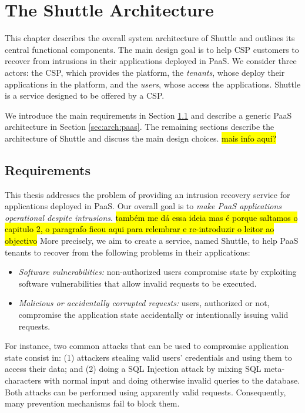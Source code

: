 
\chapter{The Shuttle Architecture}
\label{chapter:architecture}
This chapter describes the overall system architecture of Shuttle and outlines its central functional components. The main design goal is to help \acf{CSP} customers to recover from intrusions in their applications deployed in \acf{PaaS}. We consider three actors: the \acf{CSP}, which provides the platform, the \emph{tenants}, whose deploy their applications in the platform, and the \emph{users}, whose access the applications. Shuttle is a service designed to be offered by a \ac{CSP}.

We introduce the main requirements in Section \ref{sec:arch:requirements} and describe a generic \acf{PaaS} architecture in Section \ref{sec:arch:paas}. The remaining sections describe the architecture of Shuttle and discuss the main design choices. \hl{mais info aqui?}\\

\section{Requirements}
\label{sec:arch:requirements}
This thesis addresses the problem of providing an intrusion recovery service for applications deployed in \acf{PaaS}. Our overall goal is to \textit{make \ac{PaaS} applications operational despite intrusions}. \hl{também me dá essa ideia mas é porque saltamos o capitulo 2, o paragrafo ficou aqui para relembrar e re-introduzir o leitor ao objectivo} More precisely, we aim to create a service, named Shuttle, to help \ac{PaaS} tenants to recover from the following problems in their applications:
\begin{itemize}
\item \textit{Software vulnerabilities:} non-authorized users compromise state by exploiting software vulnerabilities that allow invalid requests to be executed.
\item \textit{Malicious or accidentally corrupted requests:} users, authorized or not, compromise the application state accidentally or intentionally issuing valid requests.
\end{itemize} 




For instance, two common attacks that can be used to compromise application state consist in: (1) attackers stealing valid users' credentials and using them to access their data; and (2) doing a \ac{SQL} Injection attack by mixing \ac{SQL} meta-characters with normal input and doing otherwise invalid queries to the database. Both attacks can be performed using apparently valid requests. Consequently, many prevention mechanisms fail to block them.

